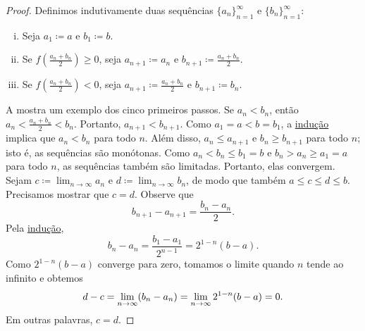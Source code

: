 \begin{proof}
Definimos indutivamente duas sequências $\{ a_n \}_{n=1}^\infty$
e $\{ b_n \}_{n=1}^\infty$:
\begin{enumerate}[(i)]
\item Seja $a_1 \coloneqq a$ e $b_1 \coloneqq b$.
\item Se $f\left(\frac{a_n+b_n}{2}\right) \geq 0$, seja
$a_{n+1} \coloneqq a_n$ e
$b_{n+1} \coloneqq \frac{a_n+b_n}{2}$.
\item Se $f\left(\frac{a_n+b_n}{2}\right) < 0$, seja
$a_{n+1} \coloneqq \frac{a_n+b_n}{2}$ e
$b_{n+1} \coloneqq b_n$.
\end{enumerate}
\begin{myfigureht}
\caption{Encontrando raízes (método da bisseção).\label{bisectfig}}
\end{myfigureht}
A  mostra um exemplo dos cinco primeiros passos.
Se $a_n < b_n$, então
$a_n < \frac{a_n+b_n}{2} < b_n$. Portanto,
$a_{n+1} < b_{n+1}$.
Como $a_1 = a < b = b_1$,
a \hyperref[induction:thm]{indução} implica que
$a_n < b_n$ para todo $n$.
Além disso, $a_n \leq a_{n+1}$ e
$b_n \geq b_{n+1}$ para todo $n$; isto é, as sequências são monótonas.
Como $a_n < b_n \leq b_1 = b$ e
$b_n > a_n \geq a_1 = a$ para todo $n$,
as sequências também são limitadas. Portanto, elas convergem.
Sejam $c \coloneqq \lim_{n\to\infty} a_n$ e
$d \coloneqq \lim_{n\to\infty} b_n$,
de modo que também $a \leq c \leq d \leq b$. Precisamos mostrar que $c=d$.
Observe que
\begin{equation*}
b_{n+1} - a_{n+1} = \frac{b_n-a_n}{2}.
\end{equation*}
Pela \hyperref[induction:thm]{indução},
\begin{equation*}
b_n - a_n = \frac{b_1-a_1}{2^{n-1}} = 2^{1-n} (b-a) .
\end{equation*}
Como $2^{1-n}(b-a)$ converge para zero, tomamos o limite quando $n$ tende
ao infinito e obtemos
\begin{equation*}
d-c = \lim_{n\to\infty} (b_n - a_n) =
\lim_{n\to\infty} 2^{1-n} (b-a) = 0.
\avoidbreak
\end{equation*}
Em outras palavras, $c=d$.


\end{proof}
